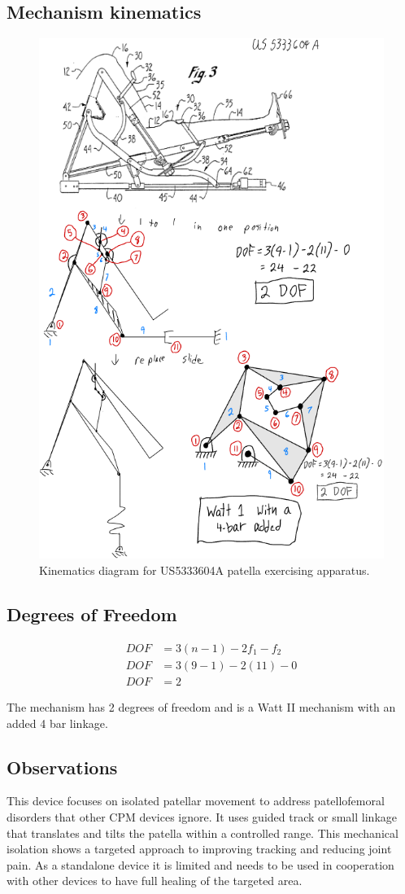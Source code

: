 \documentclass[11pt]{article}
\begin{document}
\subsection{Mechanism kinematics}
\begin{figure}[H]
  \centering
  \includegraphics[width=0.54\linewidth]{../Kinematic Mechanism Images/5333604.png}
  \caption{Kinematics diagram for US5333604A patella exercising apparatus.}
  \label{fig:US5333604A_kinematics}
\end{figure}

\subsection{Degrees of Freedom}
\[
\begin{aligned}
DOF &= 3(n-1) - 2f_1 - f_2 \\
DOF &= 3(9-1) - 2(11) - 0 \\
DOF &= 2
\end{aligned}
\]

The mechanism has 2 degrees of freedom and is a Watt II mechanism with an added 4 bar linkage.

\subsection{Observations}
This device focuses on isolated patellar movement to address patellofemoral disorders that other CPM devices ignore. It uses guided track or small linkage that translates and tilts the patella within a controlled range. This mechanical isolation shows a targeted approach to improving tracking and reducing joint pain. As a standalone device it is limited and needs to be used in cooperation with other devices to have full healing of the targeted area.
\end{document}
